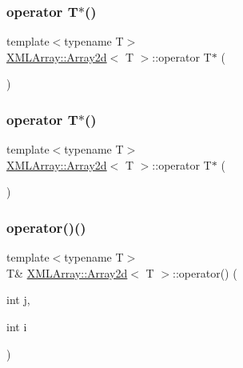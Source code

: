 \subsubsection{\texorpdfstring{operator T$\ast$()}{operator T*()}\hspace{0.1cm}{\footnotesize\ttfamily [1/2]}}
{\footnotesize\ttfamily template$<$typename T$>$ \\
\mbox{\hyperlink{classXMLArray_1_1Array2d}{X\+M\+L\+Array\+::\+Array2d}}$<$ T $>$\+::operator T$\ast$ (\begin{DoxyParamCaption}{ }\end{DoxyParamCaption})\hspace{0.3cm}{\ttfamily [inline]}}

\mbox{\label{classXMLArray_1_1Array2d_a9d46505eb6c4149239bc87ba408c6b5b}} 
\subsubsection{\texorpdfstring{operator T$\ast$()}{operator T*()}\hspace{0.1cm}{\footnotesize\ttfamily [2/2]}}
{\footnotesize\ttfamily template$<$typename T$>$ \\
\mbox{\hyperlink{classXMLArray_1_1Array2d}{X\+M\+L\+Array\+::\+Array2d}}$<$ T $>$\+::operator T$\ast$ (\begin{DoxyParamCaption}{ }\end{DoxyParamCaption})\hspace{0.3cm}{\ttfamily [inline]}}

\mbox{\label{classXMLArray_1_1Array2d_ab8618dbef1cc6b94b3345ce3da0ad996}} 
\subsubsection{\texorpdfstring{operator()()}{operator()()}\hspace{0.1cm}{\footnotesize\ttfamily [1/4]}}
{\footnotesize\ttfamily template$<$typename T$>$ \\
T\& \mbox{\hyperlink{classXMLArray_1_1Array2d}{X\+M\+L\+Array\+::\+Array2d}}$<$ T $>$\+::operator() (\begin{DoxyParamCaption}\item[{int}]{j,  }\item[{int}]{i }\end{DoxyParamCaption})\hspace{0.3cm}{\ttfamily [inline]}}



